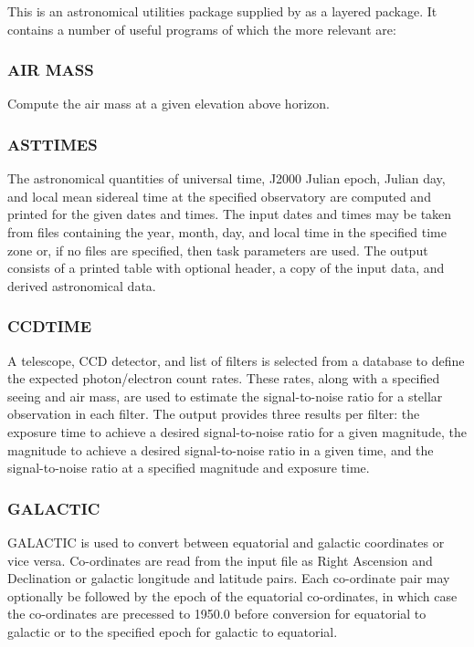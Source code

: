 This is an astronomical utilities package supplied by {\IRAFref} 
as a layered package. It contains a number of useful programs of which the more
relevant are: 

\subsubsection{AIR MASS} 

Compute the air mass at a given elevation above horizon.

\subsubsection{ASTTIMES}

The astronomical quantities of universal time, J2000 Julian epoch, Julian
day, and local mean sidereal time at the specified observatory are computed
and printed for the given dates and times. The input dates and times may be
taken from files containing the year, month, day, and local time in the
specified time zone or, if no files are specified, then task parameters are
used.  The output consists of a printed table with optional header, a copy of
the input data, and derived astronomical data.  

\subsubsection{CCDTIME} 
\label{sec:ccdtime} 

A telescope, CCD detector, and list of filters is selected from a database to
define the expected photon/electron count rates.  These rates, along with a
specified seeing and air mass, are used to estimate the signal-to-noise ratio
for a stellar observation in each filter.  The output provides three
results per filter: the exposure time to achieve a desired signal-to-noise 
ratio for a given magnitude, the magnitude to achieve a desired 
signal-to-noise ratio in a given time, and the signal-to-noise ratio 
at a specified magnitude and exposure time. 
    
\subsubsection{GALACTIC} 
\label{sec:galactic} 
 
GALACTIC is used to convert between equatorial and galactic coordinates or
vice versa. Co-ordinates are read from the input file as Right Ascension and Declination or
galactic longitude and latitude pairs. Each co-ordinate pair may optionally be
followed by the epoch of the equatorial co-ordinates, in which case the
co-ordinates are precessed to 1950.0 before conversion for equatorial to
galactic or to the specified epoch for galactic to equatorial. 
    
